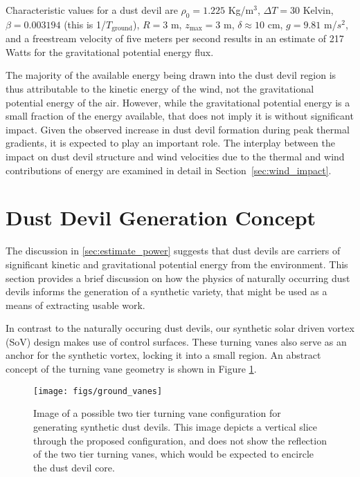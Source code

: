 Characteristic values for a dust devil are $\rho_0 = 1.225$ Kg/$\text{m}^3$, 
$\Delta T= 30$ Kelvin, $\beta = 0.003194$ (this is 1/$T_{\text{ground}}$), 
$R = 3 $ m, $z_\text{max} = 3$ m, $\delta \approx 10$ cm, $g=9.81$ m/$s^2$, and a
freestream velocity of five meters per second results in an estimate of
217 Watts for the gravitational potential energy flux. 

The majority of the available energy being drawn into the dust devil
region is thus attributable to the kinetic energy of the wind, not the
gravitational potential energy of the air.
However, while the gravitational potential energy is a small fraction of
the energy available, that does not imply it is without significant
impact. 
Given the observed increase in dust devil formation during peak thermal
gradients, it is expected to play an important role. The interplay
between the impact on dust devil structure and wind velocities due to
the thermal and wind contributions of energy are examined in detail in
Section~\ref{sec:wind_impact}. 

\section{Dust Devil Generation Concept}
\label{sec:dust_devil_concept}

The discussion in \ref{sec:estimate_power} suggests that dust devils are
carriers of significant kinetic and gravitational
potential energy from the environment. This section provides a brief
discussion on how the physics of naturally occurring dust devils informs
the generation of a synthetic variety, that might be used as a means of
extracting usable work.    

In contrast to the naturally occuring dust devils,
our synthetic solar driven vortex (SoV) design makes use of
control surfaces. These turning vanes also serve as an anchor for the
synthetic vortex, locking it into a small region. An abstract concept of
the turning vane geometry is shown in Figure \ref{fig:cartoon_vanes}.

  \begin{figure}[!htb]
    \begin{center}
     \texttt{[image: figs/ground\_vanes]}
     \caption{Image of a possible two tier turning vane 
       configuration for generating synthetic dust devils. This image depicts a 
       vertical slice through the proposed configuration, and does not show the reflection 
       of the two tier turning vanes, which would be expected to encircle the dust devil core.}
     \label{fig:cartoon_vanes}
    \end{center}
  \end{figure}

